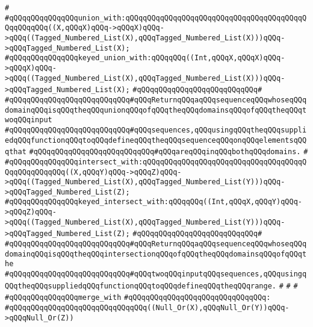 \verb|#|\newline
\verb|#qQQqqQQqqQQqqQQqunion_with:qQQqqQQqqQQqqQQqqQQqqQQqqQQqqQQqqQQqqQQqqQQqqQQqqQQq((X,qQQqX)qQQq->qQQqX)qQQq->qQQq((Tagged_Numbered_List(X),qQQqTagged_Numbered_List(X)))qQQq->qQQqTagged_Numbered_List(X);|\newline
\verb|#qQQqqQQqqQQqqQQqkeyed_union_with:qQQqqQQq((Int,qQQqX,qQQqX)qQQq->qQQqX)qQQq->qQQq((Tagged_Numbered_List(X),qQQqTagged_Numbered_List(X)))qQQq->qQQqTagged_Numbered_List(X);|\newline
\verb|#qQQqqQQqqQQqqQQqqQQqqQQqqQQq#|\newline
\verb|#qQQqqQQqqQQqqQQqqQQqqQQqqQQq#qQQqReturnqQQqaqQQqsequenceqQQqwhoseqQQqdomainqQQqisqQQqtheqQQqunionqQQqofqQQqtheqQQqdomainsqQQqofqQQqtheqQQqtwoqQQqinput|\newline
\verb|#qQQqqQQqqQQqqQQqqQQqqQQqqQQq#qQQqsequences,qQQqusingqQQqtheqQQqsuppliedqQQqfunctionqQQqtoqQQqdefineqQQqtheqQQqsequenceqQQqonqQQqelementsqQQqthat|\newline
\verb|#qQQqqQQqqQQqqQQqqQQqqQQqqQQq#qQQqareqQQqinqQQqbothqQQqdomains.|\newline
\verb|#|\newline
\verb|#qQQqqQQqqQQqqQQqintersect_with:qQQqqQQqqQQqqQQqqQQqqQQqqQQqqQQqqQQqqQQqqQQqqQQqqQQq((X,qQQqY)qQQq->qQQqZ)qQQq->qQQq((Tagged_Numbered_List(X),qQQqTagged_Numbered_List(Y)))qQQq->qQQqTagged_Numbered_List(Z);|\newline
\verb|#qQQqqQQqqQQqqQQqkeyed_intersect_with:qQQqqQQq((Int,qQQqX,qQQqY)qQQq->qQQqZ)qQQq->qQQq((Tagged_Numbered_List(X),qQQqTagged_Numbered_List(Y)))qQQq->qQQqTagged_Numbered_List(Z);|\newline
\verb|#qQQqqQQqqQQqqQQqqQQqqQQqqQQq#|\newline
\verb|#qQQqqQQqqQQqqQQqqQQqqQQqqQQq#qQQqReturnqQQqaqQQqsequenceqQQqwhoseqQQqdomainqQQqisqQQqtheqQQqintersectionqQQqofqQQqtheqQQqdomainsqQQqofqQQqthe|\newline
\verb|#qQQqqQQqqQQqqQQqqQQqqQQqqQQq#qQQqtwoqQQqinputqQQqsequences,qQQqusingqQQqtheqQQqsuppliedqQQqfunctionqQQqtoqQQqdefineqQQqtheqQQqrange.|\newline
\verb|#|\newline
\verb|#|\newline
\verb|#|\newline
\verb|#qQQqqQQqqQQqqQQqmerge_with|\newline
\verb|#qQQqqQQqqQQqqQQqqQQqqQQqqQQqqQQq:|\newline
\verb|#qQQqqQQqqQQqqQQqqQQqqQQqqQQqqQQq((Null_Or(X),qQQqNull_Or(Y))qQQq->qQQqNull_Or(Z))|\newline
